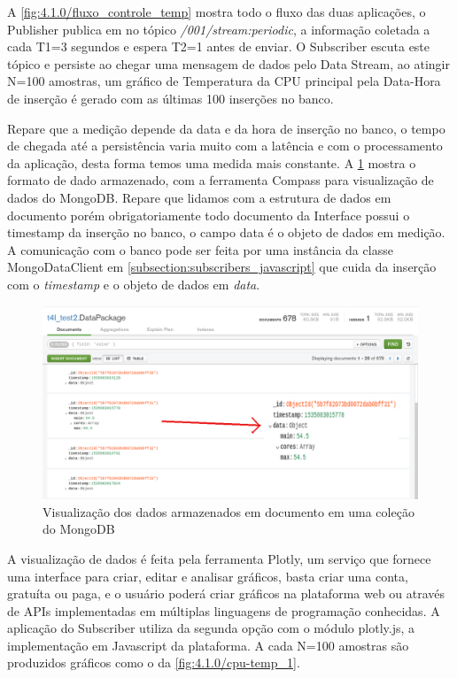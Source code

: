 A \ref{fig:4.1.0/fluxo_controle_temp} mostra todo o fluxo das duas aplicações, o Publisher publica em no tópico \textit{/001/stream:periodic}, a informação coletada a cada T1=3 segundos e espera T2=1 antes de enviar. O Subscriber escuta este tópico e persiste ao chegar uma mensagem de dados pelo Data Stream, ao atingir N=100 amostras, um gráfico de Temperatura da CPU principal pela Data-Hora de inserção é gerado com as últimas 100 inserções no banco.


Repare que a medição depende da data e da hora de inserção no banco, o tempo de chegada até a persistência varia muito com a latência e com o processamento da aplicação, desta forma temos uma medida mais constante. A \ref{fig:4.1.0/compass} mostra o formato de dado armazenado, com a ferramenta Compass para visualização de dados do MongoDB. Repare que lidamos com a estrutura de dados em documento porém obrigatoriamente todo documento da Interface possui o timestamp da inserção no banco, o campo data é o objeto de dados em medição. A comunicação com o banco pode ser feita por uma instância da classe MongoDataClient em   \ref{subsection:subscribers_javascript} que cuida da inserção com  o \textit{timestamp} e o objeto de dados em \textit{data}.

\begin{figure}[h!]
\centering
\includegraphics[width=15cm]{./02_Capitulos/02_Cap4/figures/compass}
\caption{Visualização dos dados armazenados em documento em uma coleção do MongoDB}
\label{fig:4.1.0/compass}
\end{figure}

A visualização de dados é feita pela ferramenta Plotly, um serviço que fornece uma interface para criar, editar e analisar gráficos, basta criar uma conta, gratuíta ou paga, e o usuário poderá criar gráficos na plataforma web ou através de APIs implementadas em múltiplas linguagens de programação conhecidas. A aplicação do Subscriber utiliza da segunda opção com o módulo plotly.js, a implementação em Javascript da plataforma. A cada N=100 amostras são produzidos gráficos como o da  \ref{fig:4.1.0/cpu-temp_1}.


